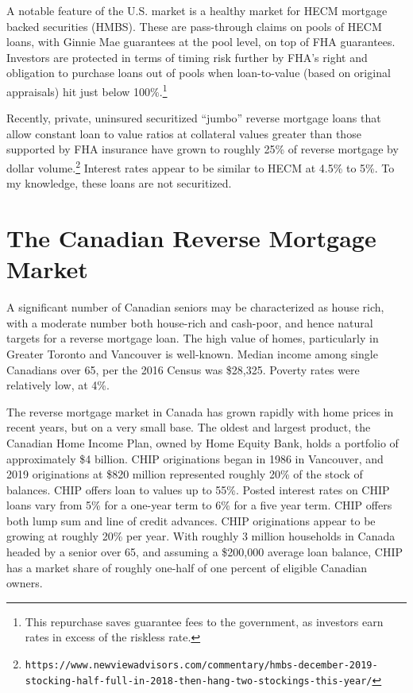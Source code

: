 \documentclass[12pt]{article}
\begin{document}
A notable feature of the U.S. market is a healthy market for HECM mortgage
backed securities (HMBS). These are pass-through claims on pools of HECM loans,
with Ginnie Mae guarantees at the pool level, on top of FHA guarantees.
Investors are protected in terms of timing risk further by FHA's right and
obligation to purchase loans out of pools when loan-to-value (based on original
appraisals) hit just below 100\%.\footnote{This repurchase saves guarantee fees
to the government, as investors earn rates in excess of the riskless rate.}

Recently, private, uninsured securitized ``jumbo'' reverse mortgage loans that
allow constant loan to value ratios at collateral values greater than those
supported by FHA insurance have grown to roughly 25\% of reverse mortgage by
dollar
volume.\footnote{\texttt{https://www.newviewadvisors.com/commentary/hmbs-december-2019-stocking-half-full-in-2018-then-hang-two-stockings-this-year/}}
Interest rates appear to be similar to HECM at 4.5\% to 5\%. To my knowledge,
these loans are not securitized.

\section{\label{sec:canada} The Canadian Reverse Mortgage Market}

A significant number of Canadian seniors may be characterized as house rich,
with a moderate number both house-rich and cash-poor, and hence natural targets
for a reverse mortgage loan. The high value of homes, particularly in Greater
Toronto and Vancouver is well-known.  Median income among single Canadians over
65, per the 2016 Census was \$28,325. Poverty rates were relatively low, at
4\%.

The reverse mortgage market in Canada has grown rapidly with home prices in
recent years, but on a very small base. The oldest and largest product, the
Canadian Home Income Plan, owned by Home Equity Bank, holds a portfolio of
approximately \$4 billion. CHIP originations began in 1986 in Vancouver, and
2019 originations at \$820 million represented roughly 20\% of the stock of
balances. CHIP offers loan to values up to 55\%. Posted interest rates on CHIP loans
vary from 5\% for a one-year term to 6\% for a five year term. CHIP offers both
lump sum and line of credit advances. CHIP originations appear to be growing at
roughly 20\% per year. With roughly 3 million households in Canada headed by a
senior over 65, and assuming a \$200,000 average loan balance, CHIP has a
market share of roughly one-half of one percent of eligible Canadian owners. 
\end{document}
